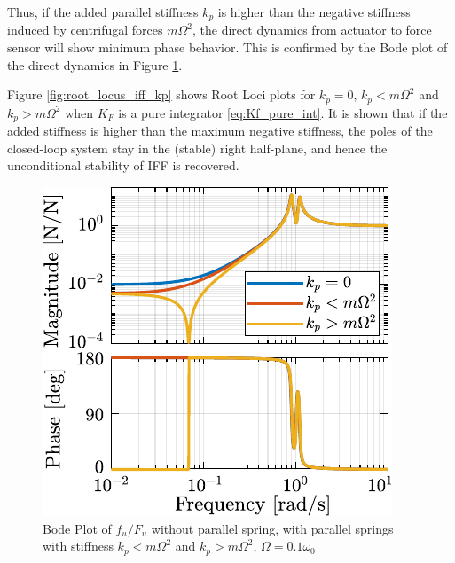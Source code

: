 \documentclass[Afour,sagev,times]{sagej}
\begin{document}
Thus, if the added parallel stiffness \(k_p\) is higher than the negative stiffness induced by centrifugal forces \(m \Omega^2\), the direct dynamics from actuator to force sensor will show minimum phase behavior.
This is confirmed by the Bode plot of the direct dynamics in Figure \ref{fig:plant_iff_kp}.

Figure \ref{fig:root_locus_iff_kp} shows Root Loci plots for \(k_p = 0\), \(k_p < m \Omega^2\) and \(k_p > m \Omega^2\) when \(K_F\) is a pure integrator \eqref{eq:Kf_pure_int}.
It is shown that if the added stiffness is higher than the maximum negative stiffness, the poles of the closed-loop system stay in the (stable) right half-plane, and hence the unconditional stability of IFF is recovered.

\begin{figure}[htbp]
\centering
\includegraphics[scale=1]{figs/plant_iff_kp.pdf}
\caption{\label{fig:plant_iff_kp}Bode Plot of \(f_u/F_u\) without parallel spring, with parallel springs with stiffness \(k_p < m \Omega^2\) and \(k_p > m \Omega^2\), \(\Omega = 0.1 \omega_0\)}
\end{figure}
\end{document}
